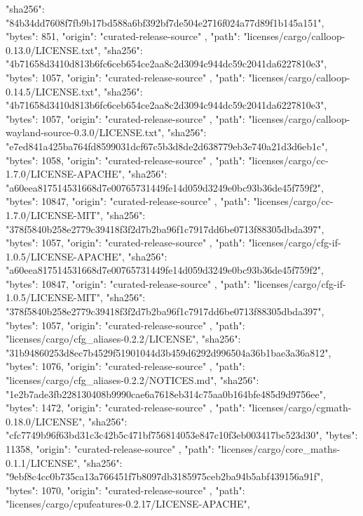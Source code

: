 {{      "sha256": "84b34dd7608f7fb9b17bd588a6bf392bf7de504e2716f024a77d89f1b145a151",
      "bytes": 851,
      "origin": "curated-release-source"
    },
    {
      "path": "licenses/cargo/calloop-0.13.0/LICENSE.txt",
      "sha256": "4b71658d3410d813b6fc6ceb654ce2aa8c2d3094c944dc59c2041da6227810e3",
      "bytes": 1057,
      "origin": "curated-release-source"
    },
    {
      "path": "licenses/cargo/calloop-0.14.5/LICENSE.txt",
      "sha256": "4b71658d3410d813b6fc6ceb654ce2aa8c2d3094c944dc59c2041da6227810e3",
      "bytes": 1057,
      "origin": "curated-release-source"
    },
    {
      "path": "licenses/cargo/calloop-wayland-source-0.3.0/LICENSE.txt",
      "sha256": "e7ed841a425ba764fd8599031dcf67c5b3d8de2d638779eb3e740a21d3d6eb1c",
      "bytes": 1058,
      "origin": "curated-release-source"
    },
    {
      "path": "licenses/cargo/cc-1.7.0/LICENSE-APACHE",
      "sha256": "a60eea817514531668d7e00765731449fe14d059d3249e0bc93b36de45f759f2",
      "bytes": 10847,
      "origin": "curated-release-source"
    },
    {
      "path": "licenses/cargo/cc-1.7.0/LICENSE-MIT",
      "sha256": "378f5840b258e2779c39418f3f2d7b2ba96f1c7917dd6be0713f88305dbda397",
      "bytes": 1057,
      "origin": "curated-release-source"
    },
    {
      "path": "licenses/cargo/cfg-if-1.0.5/LICENSE-APACHE",
      "sha256": "a60eea817514531668d7e00765731449fe14d059d3249e0bc93b36de45f759f2",
      "bytes": 10847,
      "origin": "curated-release-source"
    },
    {
      "path": "licenses/cargo/cfg-if-1.0.5/LICENSE-MIT",
      "sha256": "378f5840b258e2779c39418f3f2d7b2ba96f1c7917dd6be0713f88305dbda397",
      "bytes": 1057,
      "origin": "curated-release-source"
    },
    {
      "path": "licenses/cargo/cfg_aliases-0.2.2/LICENSE",
      "sha256": "31b94860253d8ec7b4529f51901044d3b459d6292d996504a36b1bae3a36a812",
      "bytes": 1076,
      "origin": "curated-release-source"
    },
    {
      "path": "licenses/cargo/cfg_aliases-0.2.2/NOTICES.md",
      "sha256": "1e2b7ade3fb228130408b9990cae6a7618eb314c75aa0b164bfe485d9d9756ee",
      "bytes": 1472,
      "origin": "curated-release-source"
    },
    {
      "path": "licenses/cargo/cgmath-0.18.0/LICENSE",
      "sha256": "cfc7749b96f63bd31c3c42b5c471bf756814053e847c10f3eb003417bc523d30",
      "bytes": 11358,
      "origin": "curated-release-source"
    },
    {
      "path": "licenses/cargo/core_maths-0.1.1/LICENSE",
      "sha256": "9ebf8c4cc0b735ca13a766451f7b8097db3185975ceb2ba94b5abf439156a91f",
      "bytes": 1070,
      "origin": "curated-release-source"
    },
    {
      "path": "licenses/cargo/cpufeatures-0.2.17/LICENSE-APACHE",
}}
